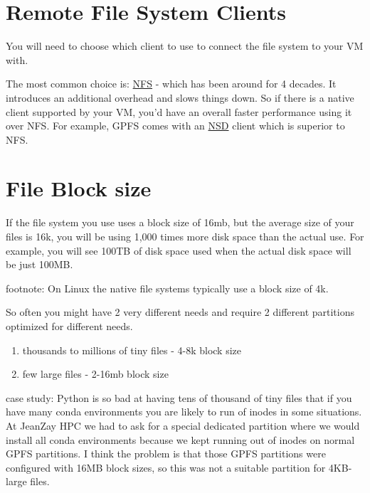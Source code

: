 \documentclass[
]{report}
\providecommand{\tightlist}{%
  \setlength{\itemsep}{0pt}\setlength{\parskip}{0pt}}\usepackage{longtable,booktabs,array}
\begin{document}
\section{Remote File System Clients}\label{remote-file-system-clients}

You will need to choose which client to use to connect the file system
to your VM with.

The most common choice is:
\href{https://en.wikipedia.org/wiki/Network_File_System}{NFS} - which
has been around for 4 decades. It introduces an additional overhead and
slows things down. So if there is a native client supported by your VM,
you'd have an overall faster performance using it over NFS. For example,
GPFS comes with an
\href{https://www.ibm.com/docs/en/linux-on-systems?topic=configurations-network-shared-disk-nsd}{NSD}
client which is superior to NFS.

\section{File Block size}\label{file-block-size}

If the file system you use uses a block size of 16mb, but the average
size of your files is 16k, you will be using 1,000 times more disk space
than the actual use. For example, you will see 100TB of disk space used
when the actual disk space will be just 100MB.

footnote: On Linux the native file systems typically use a block size of
4k.

So often you might have 2 very different needs and require 2 different
partitions optimized for different needs.

\begin{enumerate}
\def\labelenumi{\arabic{enumi}.}
\tightlist
\item
  thousands to millions of tiny files - 4-8k block size
\item
  few large files - 2-16mb block size
\end{enumerate}

case study: Python is so bad at having tens of thousand of tiny files
that if you have many conda environments you are likely to run of inodes
in some situations. At JeanZay HPC we had to ask for a special dedicated
partition where we would install all conda environments because we kept
running out of inodes on normal GPFS partitions. I think the problem is
that those GPFS partitions were configured with 16MB block sizes, so
this was not a suitable partition for 4KB-large files.
\end{document}
